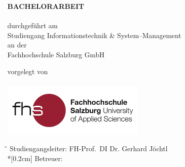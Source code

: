 \begin{titlepage}

\hspace{7cm}

\begin{center}
	{\Large\uppercase\expandafter{\bf Bachelorarbeit}}\\[0.5ex]
	\vspace{1cm}
	\Large{\bf\large \Title}\\
	\vspace{1.5cm}
	\normalsize durchgeführt am\\
	Studiengang Informationstechnik \& System--Management\\
	an der\\
	Fachhochschule Salzburg GmbH\\
\end{center}

\vspace{2cm}

\begin{center}
	\normalsize vorgelegt von
	\\
	{
		\Large{\bf\large \Author}\\
	}
	\vspace{2cm}
	\includegraphics[width=7cm]{BilderAllgemein/Logo.jpg}\medskip
\end{center}
	
\vspace{2cm}

\begin{tabbing}
	\hspace*{3cm}\=\hspace*{4cm}\= \kill
	\> Studiengangsleiter: \> FH-Prof.~DI Dr. Gerhard Jöchtl \\*[0.2cm]
	\> Betreuer: \> \Advisor
\end{tabbing}

\vfill	

\begin{center}
\VenueMonthYear\\
\end{center}
\end{titlepage}